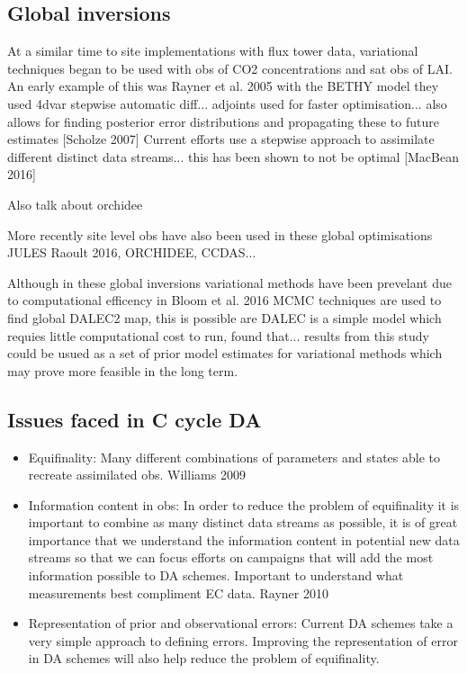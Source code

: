 \documentclass[12pt]{article}
\begin{document}
\subsection{Global inversions}

At a similar time to site implementations with flux tower data, variational techniques began to be used with obs of CO2 concentrations and sat obs of LAI. An early example of this was Rayner et al. 2005 with the BETHY model they used 4dvar stepwise automatic diff...
adjoints used for faster optimisation... also allows for finding posterior error distributions and propagating these to future estimates [Scholze 2007]
Current efforts use a stepwise approach to assimilate different distinct data streams... this has been shown to not be optimal [MacBean 2016]

Also talk about orchidee

More recently site level obs have also been used in these global optimisations JULES Raoult 2016, ORCHIDEE, CCDAS...

Although in these global inversions variational methods have been prevelant due to computational efficency in Bloom et al. 2016 MCMC techniques are used to find global DALEC2 map, this is possible are DALEC is a simple model which requies little computational cost to run, found that... results from this study could be usued as a set of prior model estimates for variational methods which may prove more feasible in the long term.

 

\subsection{Issues faced in C cycle DA}

\begin{itemize}
\item Equifinality: Many different combinations of parameters and states able to recreate assimilated obs. Williams 2009

\item Information content in obs: In order to reduce the problem of equifinality it is important to combine as many distinct data streams as possible, it is of great importance that we understand the information content in potential new data streams so that we can focus efforts on campaigns that will add the most information possible to DA schemes. Important to understand what measurements best compliment EC data. Rayner 2010

\item Representation of prior and observational errors: Current DA schemes take a very simple approach to defining errors. Improving the representation of error in DA schemes will also help reduce the problem of equifinality.  
\end{itemize}
\end{document}
